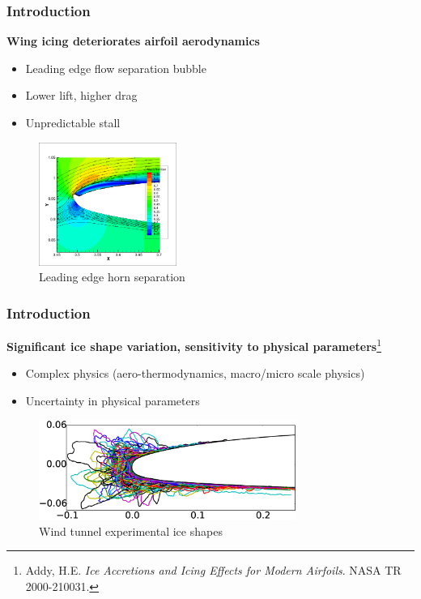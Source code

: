 \documentclass[9pt]{beamer}
\begin{document}
\begin{frame}
\frametitle{Introduction}
\label{sec-1-6}

\textbf{Wing icing deteriorates airfoil aerodynamics}
\begin{itemize}
\item Leading edge flow separation bubble
\item Lower lift, higher drag
\item Unpredictable stall
\end{itemize}

\vspace*{-0.0cm}\begin{figure}
    \includegraphics[width=0.4\textwidth]{BadHorn.png}
    \caption{Leading edge horn separation}
\end{figure}
\end{frame}
\begin{frame}
\frametitle{Introduction}
\label{sec-1-7}

\textbf{Significant ice shape variation, sensitivity to physical parameters}\footnote{Addy, H.E. \emph{Ice Accretions and Icing Effects for Modern Airfoils}. NASA TR 2000-210031.
 }
\begin{itemize}
\item Complex physics (aero-thermodynamics, macro/micro scale physics)
\item Uncertainty in physical parameters
\end{itemize}

\vspace*{-0.0cm}\begin{figure}
      \includegraphics[width=0.75\textwidth]{GlobalDataSet}
      \caption{Wind tunnel experimental ice shapes}
\end{figure}
\end{frame}
\end{document}
